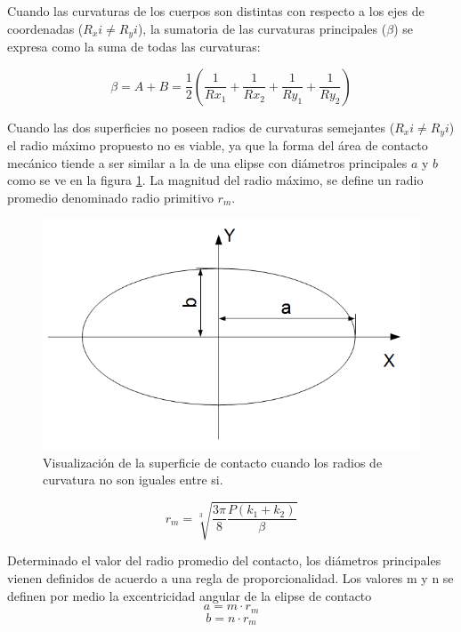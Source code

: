 \documentclass[main]{subfiles}
\begin{document}
Cuando las curvaturas de los cuerpos son distintas con respecto a los ejes de coordenadas ($R_xi \neq R_yi$), la sumatoria de las curvaturas principales ($\beta$) se expresa como la suma de todas las curvaturas:

\begin{equation}
\label{eq:ABcurve}
\beta =A+B= \frac{1}{2}  \left(\frac{1}{Rx_1}+\frac{1}{Rx_2}+\frac{1}{Ry_1}+\frac{1}{Ry_2}\right)
\end{equation} 

Cuando las dos superficies no poseen radios de curvaturas semejantes ($R_xi \neq R_yi$) el radio máximo propuesto no es viable, ya que la forma del área de contacto mecánico tiende a ser similar a la de una elipse con diámetros principales $a$ y $b$ como se ve en la figura \ref{fig:Timo1}. La magnitud del radio máximo, se define un radio promedio denominado radio primitivo $r_m$.

\begin{figure}[!htbp]
\centering
    \includegraphics[scale=0.4]{Timo1.png}
  \caption{Visualización de la superficie de contacto cuando los radios de curvatura no son iguales entre si.}
  \label{fig:Timo1}
\end{figure} 


\begin{equation}
r_m=\sqrt[3]{\frac{3\pi}{8}\frac{P(k_1+k_2)}{\beta}}
\end{equation} 

Determinado el valor del radio promedio del contacto, los diámetros principales vienen definidos de acuerdo a una regla de proporcionalidad. Los valores m y n se definen por medio la excentricidad angular de la elipse de contacto
\begin{equation} 
a=m\cdot r_m
\end{equation} 
\begin{equation} 
b=n\cdot r_m
\end{equation} 
\end{document}
